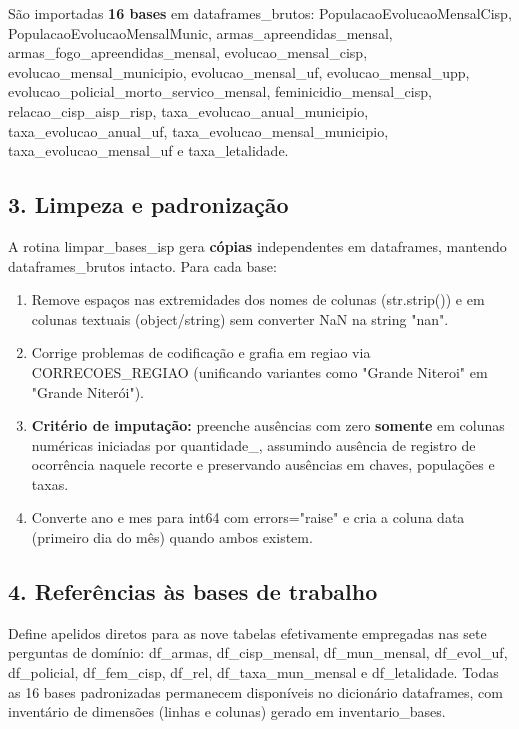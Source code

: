 \documentclass[11pt,a4paper]{article}
\newcommand{\code}[1]{{\ttfamily\footnotesize\allowbreak #1}}
\begin{document}
São importadas \textbf{16 bases} em \code{dataframes\_brutos}: \code{PopulacaoEvolucaoMensalCisp}, \code{PopulacaoEvolucaoMensalMunic}, \code{armas\_apreendidas\_mensal}, \code{armas\_fogo\_apreendidas\_mensal}, \code{evolucao\_mensal\_cisp}, \code{evolucao\_mensal\_municipio}, \code{evolucao\_mensal\_uf}, \code{evolucao\_mensal\_upp}, \code{evolucao\_policial\_morto\_servico\_mensal}, \code{feminicidio\_mensal\_cisp}, \code{relacao\_cisp\_aisp\_risp}, \code{taxa\_evolucao\_anual\_municipio}, \code{taxa\_evolucao\_anual\_uf}, \code{taxa\_evolucao\_mensal\_municipio}, \code{taxa\_evolucao\_mensal\_uf} e \code{taxa\_letalidade}.

\subsection{3. Limpeza e padronização}
A rotina \code{limpar\_bases\_isp} gera \textbf{cópias} independentes em \code{dataframes}, mantendo \code{dataframes\_brutos} intacto. Para cada base:
\begin{enumerate}
  \setlength{\itemsep}{2pt}\setlength{\parskip}{0pt}
  \item Remove espaços nas extremidades dos nomes de colunas (\code{str.strip()}) e em colunas textuais (\code{object}/\code{string}) sem converter \code{NaN} na string \code{"nan"}.
  \item Corrige problemas de codificação e grafia em \code{regiao} via \code{CORRECOES\_REGIAO} (unificando variantes como \code{"Grande Niteroi"} em \code{"Grande Niterói"}).
  \item \textbf{Critério de imputação:} preenche ausências com zero \textbf{somente} em colunas numéricas iniciadas por \code{quantidade\_}, assumindo ausência de registro de ocorrência naquele recorte e preservando ausências em chaves, populações e taxas.
  \item Converte \code{ano} e \code{mes} para \code{int64} com \code{errors="raise"} e cria a coluna \code{data} (primeiro dia do mês) quando ambos existem.
\end{enumerate}

\subsection{4. Referências às bases de trabalho}
Define apelidos diretos para as nove tabelas efetivamente empregadas nas sete perguntas de domínio: \code{df\_armas}, \code{df\_cisp\_mensal}, \code{df\_mun\_mensal}, \code{df\_evol\_uf}, \code{df\_policial}, \code{df\_fem\_cisp}, \code{df\_rel}, \code{df\_taxa\_mun\_mensal} e \code{df\_letalidade}. Todas as 16 bases padronizadas permanecem disponíveis no dicionário \code{dataframes}, com inventário de dimensões (\code{linhas} e \code{colunas}) gerado em \code{inventario\_bases}.
\end{document}
